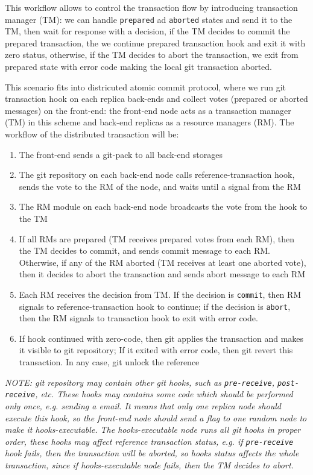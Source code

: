 \documentclass[acmlarge, screen, nonacm, 11pt]{acmart}
\newcommand{\code}[1]{\texttt{#1}}
\begin{document}
This workflow allows to control the transaction flow by introducing transaction manager (TM):
we can handle \code{prepared} ad \code{aborted} states and send it to the TM, then wait for response with a
decision, if the TM decides to commit the prepared transaction, the we continue prepared transaction hook
and exit it with zero status, otherwise, if the TM decides to abort the transaction, we exit from prepared state
with error code making the local git transaction aborted.

This scenario fits into districuted atomic commit protocol, where we run git transaction hook on each replica back-ends
and collect votes (prepared or aborted messages) on the front-end: the front-end node acts as a transaction manager (TM)
in this scheme and back-end replicas as a resource managers (RM). The workflow of the distributed transaction will be:
\begin{enumerate}
    \item The front-end sends a git-pack to all back-end storages
    \item The git repository on each back-end node calls reference-transaction hook, sends the vote to the RM
      of the node, and waits until a signal from the RM
    \item The RM module on each back-end node broadcasts the vote from the hook to the TM
    \item If all RMs are prepared (TM receives prepared votes from each RM), then the TM decides to commit,
      and sends commit message to each RM. Otherwise, if any of the RM aborted (TM receives at least one aborted vote),
      then it decides to abort the transaction and sends abort message to each RM
    \item Each RM receives the decision from TM. If the decision is \code{commit}, then RM signals to reference-transaction
      hook to continue; if the decision is \code{abort}, then the RM signals to transaction hook to exit with error code.
    \item If hook continued with zero-code, then git applies the transaction and makes it visible to git repository;
      If it exited with error code, then git revert this transaction. In any case, git unlock the reference
\end{enumerate}

\emph{NOTE: git repository may contain other git hooks, such as \code{pre-receive}, \code{post-receive}, etc.
These hooks may contains some code which should be performed only once, e.g. sending a email. It means that
only one replica node should execute this hook, so the front-end node should send a flag to one random node
to make it hooks-executable. The hooks-executable node runs all git hooks in proper order, these hooks
may affect reference transaction status, e.g. if \code{pre-receive} hook fails, then the transaction will be aborted,
so hooks status affects the whole transaction, since if hooks-executable node fails, then the TM decides to abort.}
\end{document}
